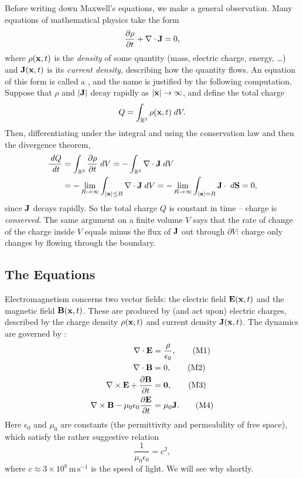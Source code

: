 \documentclass[a4paper]{scrartcl}
\begin{document}
Before writing down Maxwell's equations, we make a general observation. Many equations of mathematical physics take the form
$$
\frac{\partial \rho}{\partial t} + \nabla \cdot \mathbf{J} = 0,
$$
where $\rho(\mathbf{x}, t)$ is the \emph{density} of some quantity (mass, electric charge, energy, \dots) and $\mathbf{J}(\mathbf{x}, t)$ is its \emph{current density}, describing how the quantity flows. An equation of this form is called a , and the name is justified by the following computation. Suppose that $\rho$ and $|\mathbf{J}|$ decay rapidly as $|\mathbf{x}| \to \infty$, and define the total charge
$$
Q = \int_{\mathbb{R}^3} \rho(\mathbf{x}, t) \; d V.
$$
Then, differentiating under the integral and using the conservation law and then the divergence theorem,
\begin{align*}
	\frac{\; d Q}{\; d t} &= \int_{\mathbb{R}^3} \frac{\partial \rho}{\partial t} \; d V = -\int_{\mathbb{R}^3} \nabla \cdot \mathbf{J} \; d V \\
	&= -\lim_{R \to \infty} \int_{|\mathbf{x}| \leq R} \nabla \cdot \mathbf{J} \; d V = -\lim_{R \to \infty} \int_{|\mathbf{x}| = R} \mathbf{J} \cdot \; d \mathbf{S} = 0,
\end{align*}
since $\mathbf{J}$ decays rapidly. So the total charge $Q$ is constant in time -- charge is \emph{conserved}. The same argument on a finite volume $V$ says that the rate of change of the charge inside $V$ equals minus the flux of $\mathbf{J}$ out through $\partial V$: charge only changes by flowing through the boundary.

\subsection{The Equations}

Electromagnetism concerns two vector fields: the electric field $\mathbf{E}(\mathbf{x}, t)$ and the magnetic field $\mathbf{B}(\mathbf{x}, t)$. These are produced by (and act upon) electric charges, described by the charge density $\rho(\mathbf{x}, t)$ and current density $\mathbf{J}(\mathbf{x}, t)$. The dynamics are governed by :
\begin{align*}
	\nabla \cdot \mathbf{E} &= \frac{\rho}{\epsilon_0}, \tag{M1} \\
	\nabla \cdot \mathbf{B} &= 0, \tag{M2}\\
	\nabla \times \mathbf{E} + \frac{\partial \mathbf{B}}{\partial t} &= \mathbf{0}, \tag{M3}\\
	\nabla \times \mathbf{B} - \mu_0 \epsilon_0 \frac{\partial \mathbf{E}}{\partial t} &= \mu_0 \mathbf{J}. \tag{M4}
\end{align*}
Here $\epsilon_0$ and $\mu_0$ are constants (the permittivity and permeability of free space), which satisfy the rather suggestive relation
$$
\frac{1}{\mu_0 \epsilon_0} = c^2,
$$
where $c \approx 3 \times 10^8 \, \mathrm{m}\,\mathrm{s}^{-1}$ is the speed of light. We will see why shortly.
\end{document}
